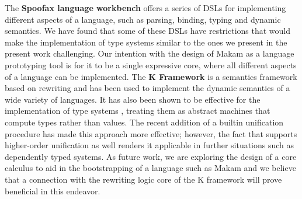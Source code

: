  The \textbf{Spoofax language workbench}
\citep{spoofax-main-reference} offers a series of DSLs for implementing
different aspects of a language, such as parsing, binding, typing and
dynamic semantics. We have found that some of these DSLs have
restrictions that would make the implementation of type systems similar
to the ones we present in the present work challenging. Our intention
with the design of Makam as a language prototyping tool is for it to be
a single expressive core, where all different aspects of a language can
be implemented. The \textbf{K Framework}
\citep{k-framework-main-reference} is a semantics framework based on
rewriting and has been used to implement the dynamic semantics of a wide
variety of languages. It has also been shown to be effective for the
implementation of type systems \citep{k-framework-type-systems},
treating them as abstract machines that compute types rather than
values. The recent addition of a builtin unification procedure has made
this approach more effective; however, the fact that \lamprolog supports
higher-order unification as well renders it applicable in further
situations such as dependently typed systems. As future work, we are
exploring the design of a core calculus to aid in the bootstrapping of a
language such as Makam and we believe that a connection with the
rewriting logic core of the K framework will prove beneficial in this
endeavor.
